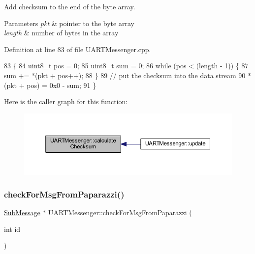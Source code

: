 Add checksum to the end of the byte array. 


\begin{DoxyParams}{Parameters}
{\em pkt} & pointer to the byte array \\
\hline
{\em length} & number of bytes in the array \\
\hline
\end{DoxyParams}


Definition at line 83 of file U\+A\+R\+T\+Messenger.\+cpp.


\begin{DoxyCode}
83                                                                         \{
84     uint8\_t pos = 0;
85     uint8\_t sum = 0;
86     \textcolor{keywordflow}{while} (pos < (length - 1)) \{
87         sum += *(pkt + pos++);
88     \}
89     \textcolor{comment}{// put the checksum into the data stream}
90     *(pkt + pos) = 0x0 - sum;
91 \}
\end{DoxyCode}
Here is the caller graph for this function\+:\nopagebreak
\begin{figure}[H]
\begin{center}
\leavevmode
\includegraphics[width=350pt]{class_u_a_r_t_messenger_a21e6194acf3039eafdbb4e4c3b7876a3_icgraph}
\end{center}
\end{figure}
\mbox{\label{class_u_a_r_t_messenger_affb33ad31e70001505e14d02e1f8a018}} 
\subsubsection{\texorpdfstring{check\+For\+Msg\+From\+Paparazzi()}{checkForMsgFromPaparazzi()}}
{\footnotesize\ttfamily \hyperlink{struct_sub_message}{Sub\+Message} $\ast$ U\+A\+R\+T\+Messenger\+::check\+For\+Msg\+From\+Paparazzi (\begin{DoxyParamCaption}\item[{int}]{id }\end{DoxyParamCaption})}



